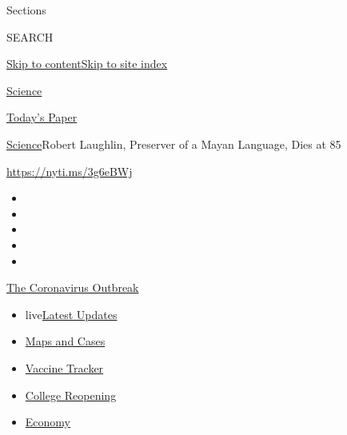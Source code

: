 Sections

SEARCH

\protect\hyperlink{site-content}{Skip to
content}\protect\hyperlink{site-index}{Skip to site index}

\href{https://www.nytimes3xbfgragh.onion/section/science}{Science}

\href{https://myaccount.nytimes3xbfgragh.onion/auth/login?response_type=cookie\&client_id=vi}{}

\href{https://www.nytimes3xbfgragh.onion/section/todayspaper}{Today's
Paper}

\href{/section/science}{Science}\textbar{}Robert Laughlin, Preserver of
a Mayan Language, Dies at 85

\url{https://nyti.ms/3g6eBWj}

\begin{itemize}
\item
\item
\item
\item
\item
\end{itemize}

\href{https://www.nytimes3xbfgragh.onion/news-event/coronavirus?action=click\&pgtype=Article\&state=default\&region=TOP_BANNER\&context=storylines_menu}{The
Coronavirus Outbreak}

\begin{itemize}
\tightlist
\item
  live\href{https://www.nytimes3xbfgragh.onion/2020/08/04/world/coronavirus-covid-19.html?action=click\&pgtype=Article\&state=default\&region=TOP_BANNER\&context=storylines_menu}{Latest
  Updates}
\item
  \href{https://www.nytimes3xbfgragh.onion/interactive/2020/us/coronavirus-us-cases.html?action=click\&pgtype=Article\&state=default\&region=TOP_BANNER\&context=storylines_menu}{Maps
  and Cases}
\item
  \href{https://www.nytimes3xbfgragh.onion/interactive/2020/science/coronavirus-vaccine-tracker.html?action=click\&pgtype=Article\&state=default\&region=TOP_BANNER\&context=storylines_menu}{Vaccine
  Tracker}
\item
  \href{https://www.nytimes3xbfgragh.onion/2020/08/02/us/covid-college-reopening.html?action=click\&pgtype=Article\&state=default\&region=TOP_BANNER\&context=storylines_menu}{College
  Reopening}
\item
  \href{https://www.nytimes3xbfgragh.onion/live/2020/08/03/business/stock-market-today-coronavirus?action=click\&pgtype=Article\&state=default\&region=TOP_BANNER\&context=storylines_menu}{Economy}
\end{itemize}

